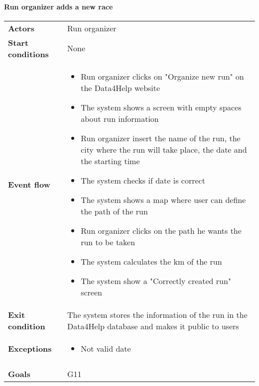\paragraph{Run organizer adds a new race}
\begin{center}
\begin{table}[H]
\centering
\begin{tabular}{l|l}
\textbf{Actors} & Run organizer \\
\textbf{Start conditions} & None \\
\textbf{Event flow}  & \begin{minipage}[t]{0.7\textwidth}
    \begin{itemize}
    \item Run organizer clicks on "Organize new run" on the Data4Help website 
    \item The system shows a screen with empty spaces about run information
    \item Run organizer insert the name of the run, the city where the run will take place, the date and the starting time
    \item The system checks if date is correct
    \item The system shows a map where user can define the path of the run
    \item Run organizer clicks on the path he wants the run to be taken
    \item The system calculates the km of the run
    \item The system show a "Correctly created run" screen
\end{itemize}
    
\end{minipage} \\
\textbf{Exit condition} & The system stores the information of the run in the Data4Help database and makes it public to users \\
\textbf{Exceptions} & \begin{minipage}[t]{0.7\textwidth}
    \begin{itemize}
\item Not valid date
    \end{itemize}
    
\end{minipage} \\ \\
\textbf{Goals} & G11
\end{tabular}

\end{table}
\end{center}





